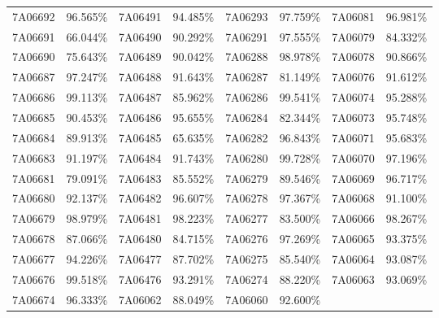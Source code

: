 \documentclass[12pt]{article}%
\begin{document}
\begin{longtable}{|cc|cc|cc|cc|}
7A06692              & 96.565\% & 7A06491              & 94.485\% & 7A06293              & 97.759\% & \multicolumn{1}{l}{7A06081             } & 96.981\% \\
7A06691              & 66.044\% & 7A06490              & 90.292\% & 7A06291              & 97.555\% & \multicolumn{1}{l}{7A06079             } & 84.332\% \\
7A06690              & 75.643\% & 7A06489              & 90.042\% & 7A06288              & 98.978\% & \multicolumn{1}{l}{7A06078             } & 90.866\% \\
7A06687              & 97.247\% & 7A06488              & 91.643\% & 7A06287              & 81.149\% & \multicolumn{1}{l}{7A06076             } & 91.612\% \\
7A06686              & 99.113\% & 7A06487              & 85.962\% & 7A06286              & 99.541\% & \multicolumn{1}{l}{7A06074             } & 95.288\% \\
7A06685              & 90.453\% & 7A06486              & 95.655\% & 7A06284              & 82.344\% & \multicolumn{1}{l}{7A06073             } & 95.748\% \\
7A06684              & 89.913\% & 7A06485              & 65.635\% & 7A06282              & 96.843\% & \multicolumn{1}{l}{7A06071             } & 95.683\% \\
7A06683              & 91.197\% & 7A06484              & 91.743\% & 7A06280              & 99.728\% & \multicolumn{1}{l}{7A06070             } & 97.196\% \\
7A06681              & 79.091\% & 7A06483              & 85.552\% & 7A06279              & 89.546\% & \multicolumn{1}{l}{7A06069             } & 96.717\% \\
7A06680              & 92.137\% & 7A06482              & 96.607\% & 7A06278              & 97.367\% & \multicolumn{1}{l}{7A06068             } & 91.100\% \\
7A06679              & 98.979\% & 7A06481              & 98.223\% & 7A06277              & 83.500\% & \multicolumn{1}{l}{7A06066             } & 98.267\% \\
7A06678              & 87.066\% & 7A06480              & 84.715\% & 7A06276              & 97.269\% & \multicolumn{1}{l}{7A06065             } & 93.375\% \\
7A06677              & 94.226\% & 7A06477              & 87.702\% & 7A06275              & 85.540\% & \multicolumn{1}{l}{7A06064             } & 93.087\% \\
7A06676              & 99.518\% & 7A06476              & 93.291\% & 7A06274              & 88.220\% & \multicolumn{1}{l}{7A06063             } & 93.069\% \\
7A06674              & 96.333\% & 7A06062              & 88.049\% & 7A06060              & 92.600\% &   &  \\
    \hline
\end{longtable}
\end{document}
